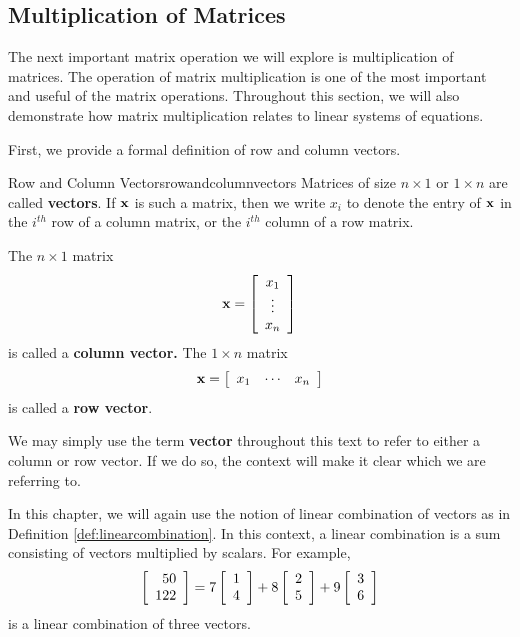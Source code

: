 \subsection{Multiplication of Matrices}

The next important matrix operation we will explore is multiplication
of matrices. The
operation of matrix multiplication is one of the most important and
useful of the matrix operations.  Throughout this section, we will
also demonstrate how matrix multiplication relates to linear systems
of equations.

First, we provide a formal definition of row and column vectors. 

\begin{definition}{Row and Column Vectors}{rowandcolumnvectors}
Matrices of size $n\times 1$ or $1\times n$ are called \textbf{vectors}. If $\mathbf{x}$ is such a matrix, then we write $x_{i}$ to 
denote the entry of $\mathbf{x}$ in the $i^{th}$ row of a column matrix, or the $i^{th}$ column of a row matrix. 

The $n\times 1$ matrix
\begin{equation*}
\mathbf{x}=\left[
\begin{array}{c}
x_{1} \\
\vdots \\
x_{n}
\end{array}
\right]
\end{equation*}
is called
 a \textbf{column vector.} The $1\times n$ matrix
\begin{equation*}
\mathbf{x} = \left[
\begin{array}{ccc}
x_{1} & \cdots & x_{n}
\end{array}
\right]
\end{equation*}
is called a \textbf{row vector}.
\end{definition}

We may simply use the term \textbf{vector} throughout this text to refer to either a column or row vector. 
If we do so, the context will make it clear which we are referring to.

In this chapter, we will again use the notion of linear combination of
vectors as in  Definition \ref{def:linearcombination}.  In this context, a linear combination is a sum
consisting of vectors multiplied by scalars.  For example,
\begin{equation*}
\left[
\begin{array}{r}
50 \\
122
\end{array}
\right]
=
7\left[
\begin{array}{r}
1 \\
4
\end{array}
\right] +8\left[
\begin{array}{r}
2 \\
5
\end{array}
\right] +9\left[
\begin{array}{r}
3 \\
6
\end{array}
\right]
\end{equation*}
is a linear combination of three vectors. 


